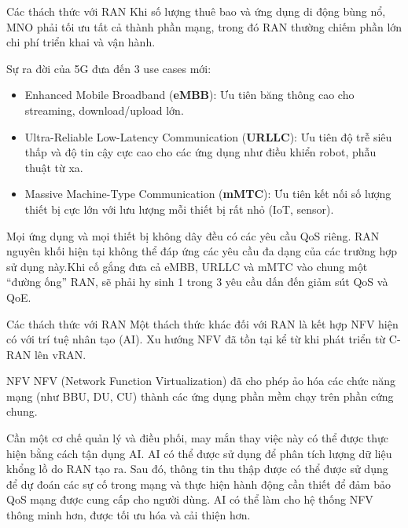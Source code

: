
\begin{frame}{Các thách thức với RAN}
  Khi số lượng thuê bao và ứng dụng di động bùng nổ, MNO phải tối ưu tất cả thành phần mạng, trong đó RAN thường chiếm phần lớn chi phí triển khai và vận hành.

    \vspace{0.2cm}

  Sự ra đời của 5G đưa đến 3 use cases mới:
  \begin{itemize}
    \item Enhanced Mobile Broadband (\textbf{eMBB}): Ưu tiên băng thông cao cho streaming, download/upload lớn.
    \item Ultra-Reliable Low-Latency Communication (\textbf{URLLC}): Ưu tiên độ trễ siêu thấp và độ tin cậy cực cao cho các ứng dụng như điều khiển robot, phẫu thuật từ xa.
    \item Massive Machine-Type Communication (\textbf{mMTC}): Ưu tiên kết nối số lượng thiết bị cực lớn với lưu lượng mỗi thiết bị rất nhỏ (IoT, sensor).
  \end{itemize}

  \vspace{0.2cm}
  Mọi ứng dụng và mọi thiết bị không dây đều có các yêu cầu QoS riêng. RAN nguyên khối hiện tại không thể đáp ứng các yêu cầu đa dạng của các trường hợp sử dụng này.Khi cố gắng đưa cả eMBB, URLLC và mMTC vào chung một “đường ống” RAN, sẽ phải hy sinh 1 trong 3 yêu cầu dấn đến giảm sút QoS và QoE.     

\end{frame}

\begin{frame}{Các thách thức với RAN}
  Một thách thức khác đối với RAN là kết hợp NFV hiện có với trí tuệ nhân tạo (AI). Xu hướng NFV đã tồn tại kể từ khi phát triển từ C-RAN lên vRAN.
  \begin{block}{NFV}
    NFV (Network Function Virtualization) đã cho phép ảo hóa các chức năng mạng (như BBU, DU, CU) thành các ứng dụng phần mềm chạy trên phần cứng chung.
  \end{block}
  Cần một cơ chế quản lý và điều phối, may mắn thay việc này có thể được thực hiện bằng cách tận dụng AI. AI có thể được sử dụng để phân tích lượng dữ liệu khổng lồ do RAN tạo ra. Sau đó, thông tin thu thập được có thể được sử dụng để dự đoán các sự cố trong mạng và thực hiện hành động cần thiết để đảm bảo QoS mạng được cung cấp cho người dùng. AI có thể làm cho hệ thống NFV thông minh hơn, được tối ưu hóa và cải thiện hơn. 
  
\end{frame}

